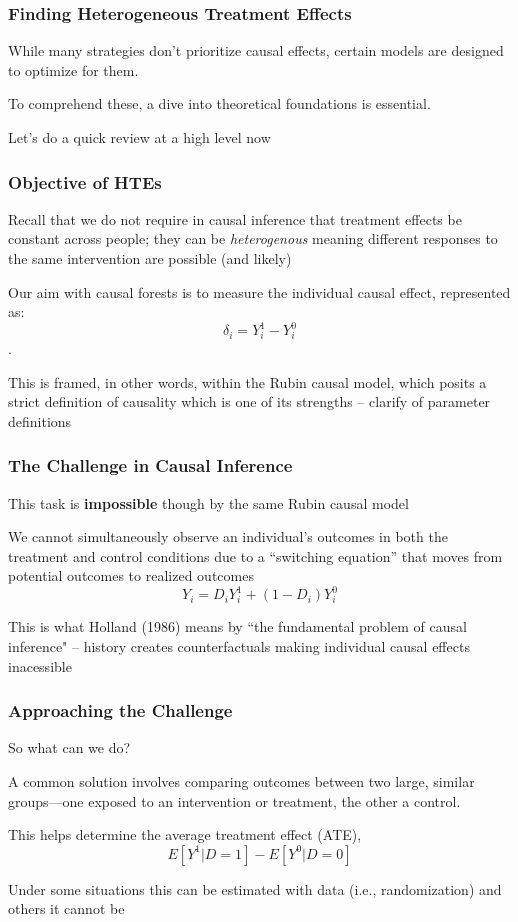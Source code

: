 \documentclass{beamer}
\begin{document}
\begin{frame}
\frametitle{Finding Heterogeneous Treatment Effects}
While many strategies don't prioritize causal effects, certain models are designed to optimize for them. \bigskip

To comprehend these, a dive into theoretical foundations is essential. 

\bigskip

Let's do a quick review at a high level now
\end{frame}

\begin{frame}
\frametitle{Objective of HTEs}

Recall that we do not require in causal inference that treatment effects be constant across people; they can be \emph{heterogenous} meaning different responses to the same intervention are possible (and likely)
\bigskip


Our aim with causal forests is to measure the individual causal effect, represented as: $$\delta_i = Y^1_i - Y^0_i$$. \bigskip


This is framed, in other words, within the Rubin causal model, which posits a strict definition of causality which is one of its strengths -- clarify of parameter definitions


\end{frame}

\begin{frame}
\frametitle{The Challenge in Causal Inference}

This task is \textbf{impossible} though by the same Rubin causal model

\bigskip

We cannot simultaneously observe an individual's outcomes in both the treatment and control conditions due to a ``switching equation'' that moves from potential outcomes to realized outcomes$$Y_i = D_iY^1_i + (1-D_i)Y^0_i$$

\bigskip 

This is what Holland (1986) means by “the fundamental problem of causal inference" -- history creates counterfactuals making individual causal effects inacessible
\end{frame}

\begin{frame}
\frametitle{Approaching the Challenge}

So what can we do?

\bigskip

A common solution involves comparing outcomes between two large, similar groups—one exposed to an intervention or treatment, the other a control.

\bigskip 

This helps determine the average treatment effect (ATE), $$E[Y^1|D=1] - E[Y^0|D=0]$$

Under some situations this can be estimated with data (i.e., randomization) and others it cannot be
\end{frame}
\end{document}
